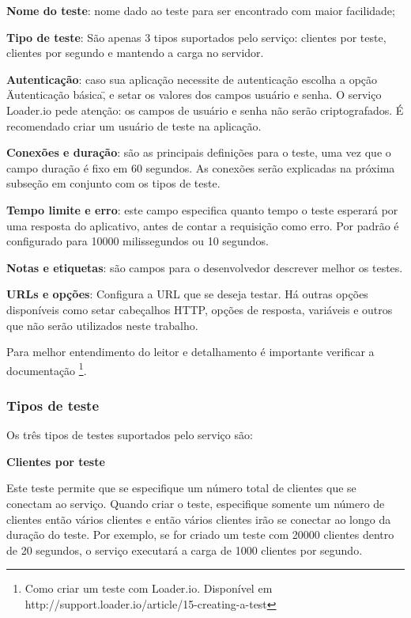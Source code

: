   \textbf{Nome do teste}: nome dado ao teste para ser encontrado com maior facilidade;

  \textbf{Tipo de teste}: São apenas 3 tipos suportados pelo serviço: clientes por teste, clientes por segundo e mantendo
  a carga no servidor.

  \textbf{Autenticação}: caso sua aplicação necessite de autenticação escolha a opção \"Autenticação básica\",
  e setar os valores dos campos usuário e senha. O serviço Loader.io pede atenção:
  os campos de usuário e senha não serão criptografados. É recomendado criar um usuário de teste na aplicação.

  \textbf{Conexões e duração}: são as principais definições para o teste, uma vez que o campo duração
  é fixo em 60 segundos. As conexões serão explicadas na próxima subseção em conjunto com os tipos de teste.

  \textbf{Tempo limite e erro}: este campo especifica quanto tempo o teste esperará por uma resposta do aplicativo, antes
  de contar a requisição como erro. Por padrão é configurado para 10000 milissegundos ou 10 segundos.

  \textbf{Notas e etiquetas}: são campos para o desenvolvedor descrever  melhor os testes.

  \textbf{URLs e opções}: Configura a \ac{URL} que se deseja testar. Há outras opções disponíveis como setar cabeçalhos \ac{HTTP},
  opções de resposta, variáveis e outros que não serão utilizados neste trabalho.

  Para melhor entendimento do leitor e detalhamento é importante verificar
  a documentação \footnote[19]{Como criar um teste com Loader.io. Disponível em http://support.loader.io/article/15-creating-a-test}.

\subsubsection{Tipos de teste}

  Os três tipos de testes suportados pelo serviço são:

  \textbf{Clientes por teste}

  Este teste permite que se especifique um número total de clientes que se conectam ao serviço. Quando criar o teste,
  especifique somente um número de clientes então vários clientes e então vários clientes irão se conectar ao longo da duração do teste.
  Por exemplo, se for criado um teste com 20000 clientes dentro de 20 segundos, o serviço executará a carga de
  1000 clientes por segundo.

